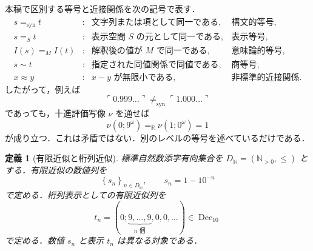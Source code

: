 \documentclass[a4paper,11pt]{ltjsarticle}
\theoremstyle{jpdef}
\newtheorem{definition}{定義}[section]
\theoremstyle{jpthm}
\newcommand{\N}{\mathbb{N}}
\newcommand{\R}{\mathbb{R}}
\newcommand{\Dec}{\operatorname{Dec}_{10}}
\newcommand{\Ns}{\N_{>0}}
\newcommand{\DN}{D_{\N}}
\newcommand{\seq}[2]{\left\{#1\right\}_{#2}}
\begin{document}
本稿で区別する等号と近接関係を次の記号で表す．
\[
\begin{array}{rcll}
 s =_{\mathrm{syn}} t &:& \text{文字列または項として同一である},&\text{構文的等号},\\
 s =_{S} t &:& \text{表示空間 }S\text{ の元として同一である},&\text{表示等号},\\
 I(s)=_{M}I(t) &:& \text{解釈後の値が }M\text{ で同一である},&\text{意味論的等号},\\
 s\sim t &:& \text{指定された同値関係で同値である},&\text{商等号},\\
 x\approx y &:& x-y\text{ が無限小である},&\text{非標準的近接関係}.
\end{array}
\]
したがって，例えば
\[
  \ulcorner0.999\ldots\urcorner\ne_{\mathrm{syn}}\ulcorner1.000\ldots\urcorner
\]
であっても，十進評価写像 \(\nu\) を通せば
\[
  \nu(0;9^\omega)=_{\R}\nu(1;0^\omega)=1
\]
が成り立つ．これは矛盾ではない．別のレベルの等号を述べているだけである．

\begin{definition}[有限近似と桁列近似]
標準自然数添字有向集合を \(\DN=(\Ns,\le)\) とする．有限近似の数値列を
\[
  \seq{s_n}{n\in\DN},\qquad s_n=1-10^{-n}
\]
で定める．桁列表示としての有限近似列を
\[
  t_n=(0;\underbrace{9,\ldots,9}_{n\text{ 個}},0,0,\ldots)\in\Dec
\]
で定める．数値 \(s_n\) と表示 \(t_n\) は異なる対象である．
\end{definition}
\end{document}
